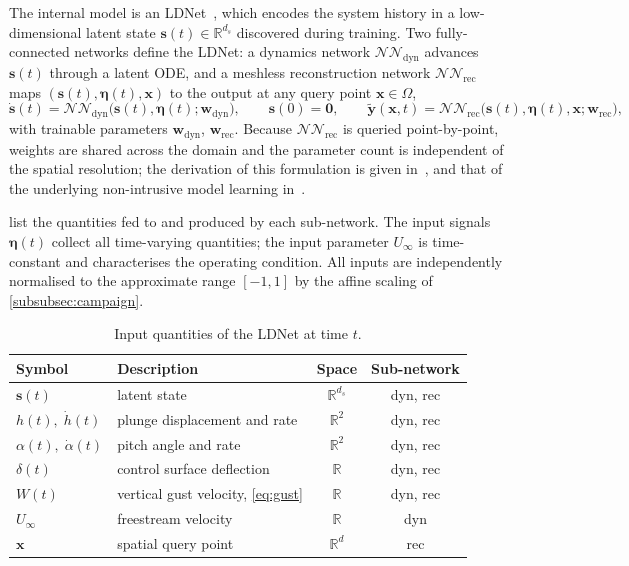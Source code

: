The internal model is an LDNet~\cite{Regazzoni}, which encodes the system history in a low-dimensional latent state $\mathbf{s}(t) \in \mathbb{R}^{d_s}$ discovered during training. Two fully-connected networks define the LDNet: a dynamics network $\mathcal{NN}_{\mathrm{dyn}}$ advances $\mathbf{s}(t)$ through a latent ODE, and a meshless reconstruction network $\mathcal{NN}_{\mathrm{rec}}$ maps $(\mathbf{s}(t),\boldsymbol{\eta}(t), \mathbf{x})$ to the output at any query point $\mathbf{x} \in \Omega$,
\begin{equation}
\dot{\mathbf{s}}(t) = \mathcal{NN}_{\mathrm{dyn}}\big(\mathbf{s}(t), \boldsymbol{\eta}(t);
    \mathbf{w}_{\mathrm{dyn}}\big), \qquad \mathbf{s}(0) = \mathbf{0}, \qquad
\widetilde{\mathbf{y}}(\mathbf{x},t) = \mathcal{NN}_{\mathrm{rec}}\big(\mathbf{s}(t),
    \boldsymbol{\eta}(t), \mathbf{x}; \mathbf{w}_{\mathrm{rec}}\big),
\label{eq:LDNet_system}
\end{equation}
with trainable parameters $\mathbf{w}_{\mathrm{dyn}}$, $\mathbf{w}_{\mathrm{rec}}$. Because $\mathcal{NN}_{\mathrm{rec}}$ is queried point-by-point, weights are shared across the domain and the parameter count is independent of the spatial resolution; the derivation of this formulation is given in~\cite{Regazzoni}, and that of the underlying non-intrusive model learning in~\cite{RegazzoniDedeQuarteroni2019}.

 list the quantities fed to and produced by each sub-network. The input signals $\boldsymbol{\eta}(t)$ collect all time-varying quantities; the input parameter $U_\infty$ is time-constant and characterises the operating condition. All inputs are independently normalised to the approximate range $[-1,1]$ by the affine scaling of \cref{subsubsec:campaign}.

\begin{table}[t]
    \centering
    \begin{tabular}{|l|l|c|c|}
    \hline
    \rowcolor{bluePoli!40}
    Symbol & Description & Space & Sub-network \T\B \\
    \hline\hline
    $\mathbf{s}(t)$ & latent state & $\mathbb{R}^{d_s}$ & dyn, rec \T\B \\
    \hline
    $h(t),\;\dot{h}(t)$ & plunge displacement and rate & $\mathbb{R}^2$ & dyn, rec \T\B \\
    \hline
    $\alpha(t),\;\dot{\alpha}(t)$ & pitch angle and rate & $\mathbb{R}^2$ & dyn, rec \T\B \\
    \hline
    $\delta(t)$ & control surface deflection & $\mathbb{R}$ & dyn, rec \T\B \\
    \hline
    $W(t)$ & vertical gust velocity, \cref{eq:gust} & $\mathbb{R}$ & dyn, rec \T\B \\
    \hline
    $U_\infty$ & freestream velocity & $\mathbb{R}$ & dyn \T\B \\
    \hline
    $\mathbf{x}$ & spatial query point & $\mathbb{R}^{d}$ & rec \B \\
    \hline
    \end{tabular}
    \\[6pt]
    \caption{Input quantities of the LDNet at time $t$.}
    \label{tab:ldnet_inputs}
\end{table}

